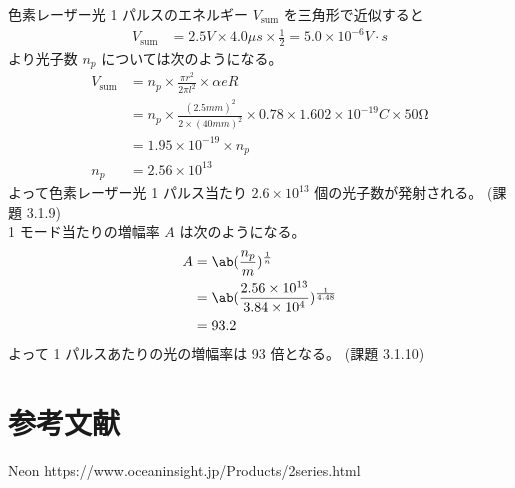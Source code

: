 \documentclass[uplatex,dvipdfmx,a4paper,11pt]{jlreq}
\numberwithin{equation}{section}
\theoremstyle{definition}
\begin{document}
色素レーザー光 1 パルスのエネルギー $V_{\mathrm{sum}}$ を三角形で近似すると
\begin{align}
  V_{\mathrm{sum}} & = 2.5\si{V} \times 4.0\si{\mu s} \times \frac{1}{2} = 5.0\times 10^{-6}\si{V\cdot s}
\end{align}
より光子数 $n_p$ については次のようになる。
\begin{align}
  V_{\mathrm{sum}} & = n_p \times\frac{\pi r^2}{2\pi l^2}\times \alpha eR                                                                    \\
                   & = n_p \times\frac{(2.5 \si{mm})^2}{2\times (40\si{mm})^2}\times 0.78\times 1.602\times 10^{-19}\si{C}\times 50\si{\ohm} \\
                   & = 1.95\times 10^{-19}\times n_p                                                                                         \\
  n_p              & = 2.56\times 10^{13}
\end{align}
よって色素レーザー光 1 パルス当たり $2.6\times 10^{13}$ 個の光子数が発射される。
(課題 3.1.9) \\

1 モード当たりの増幅率 $A$ は次のようになる。
\begin{align}
  A & = \ab(\frac{n_p}{m})^{\frac{1}{n}}                                 \\
    & = \ab(\frac{2.56\times 10^{13}}{3.84\times 10^4})^{\frac{1}{4.48}} \\
    & = 93.2
\end{align}
よって 1 パルスあたりの光の増幅率は 93 倍となる。
(課題 3.1.10) \\

\section{参考文献}
Neon
https://www.oceaninsight.jp/Products/2series.html
\end{document}
